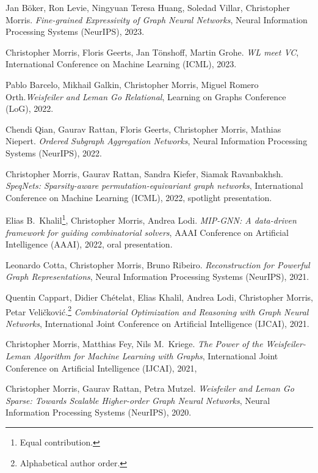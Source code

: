 \documentclass[11pt, a4paper, DIV=14, headings=small]{scrartcl}
\begin{document}
\begin{thebibliography}{15}
		Jan Böker, Ron Levie, Ningyuan Teresa Huang, Soledad Villar, Christopher Morris.
		\emph{Fine-grained Expressivity of Graph Neural Networks},  
		Neural Information Processing Systems (NeurIPS), 2023.		
		
		Christopher Morris, Floris Geerts, Jan Tönshoff, Martin Grohe.
		\emph{WL meet VC},
		International Conference on Machine Learning (ICML), 2023.
		
		Pablo Barcelo, Mikhail Galkin, Christopher Morris, Miguel Romero Orth.\footnotemark[2]
		\emph{Weisfeiler and Leman Go Relational},
		Learning on Graphs Conference (LoG), 2022.
		
		Chendi Qian, Gaurav Rattan, Floris Geerts, Christopher Morris, Mathias Niepert.
		\emph{Ordered Subgraph Aggregation Networks},
		Neural Information Processing Systems (NeurIPS), 2022.
		
		Christopher Morris, Gaurav Rattan, Sandra Kiefer, Siamak Ravanbakhsh.
		\emph{SpeqNets: Sparsity-aware permutation-equivariant graph networks},
		International Conference on Machine Learning (ICML), 2022, spotlight presentation.
		
		Elias B.\, Khalil\footnote{Equal contribution.}, Christopher Morris{\footnotemark[1]}, Andrea Lodi.
		\emph{MIP-GNN: A data-driven framework for guiding combinatorial solvers},
		AAAI Conference on Artificial Intelligence (AAAI), 2022, oral presentation.
		
		Leonardo Cotta, Christopher Morris, Bruno Ribeiro.
		\emph{Reconstruction for Powerful Graph Representations},
		Neural Information Processing Systems (NeurIPS), 2021.
		
		Quentin Cappart, Didier Chételat, Elias Khalil, Andrea Lodi, Christopher Morris, Petar Veli\v{c}kovi\'{c}.\footnote{Alphabetical author order.}
		\emph{Combinatorial Optimization and Reasoning with Graph Neural Networks},
		International Joint Conference on Artificial Intelligence (IJCAI), 2021.
		
		Christopher Morris, Matthias Fey, Nils M.~Kriege.
		\emph{The Power of the Weisfeiler-Leman Algorithm for Machine Learning with Graphs},
		International Joint Conference on Artificial Intelligence (IJCAI), 2021,
		
		Christopher Morris, Gaurav Rattan, Petra Mutzel.
		\emph{Weisfeiler and Leman Go Sparse: Towards Scalable Higher-order Graph Neural Networks},
		Neural Information Processing Systems (NeurIPS), 2020.
		

\end{thebibliography}
\end{document}
